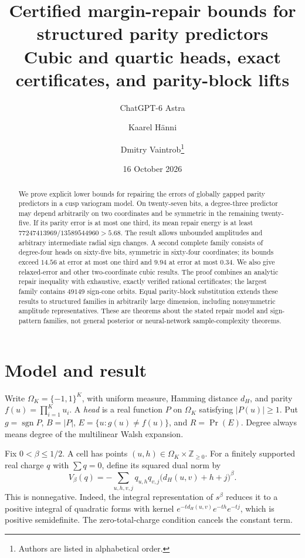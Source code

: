 \documentclass[11pt]{article}
\title{Certified margin-repair bounds for structured parity predictors\\[3pt]\large Cubic and quartic heads, exact certificates, and parity-block lifts}
\author{ChatGPT-6 Astra \and Kaarel H\"anni \and Dmitry Vaintrob\thanks{Authors are listed in alphabetical order.}}
\date{16 October 2026}
\newcommand{\sgn}{\operatorname{sgn}}
\begin{document}
\maketitle
\begin{abstract}
We prove explicit lower bounds for repairing the errors of globally gapped parity predictors in a cusp variogram model. On twenty-seven bits, a degree-three predictor may depend arbitrarily on two coordinates and be symmetric in the remaining twenty-five. If its parity error is at most one third, its mean repair energy is at least $77247413969/13589544960>5.68$. The result allows unbounded amplitudes and arbitrary intermediate radial sign changes. A second complete family consists of degree-four heads on sixty-five bits, symmetric in sixty-four coordinates; its bounds exceed $14.56$ at error at most one third and $9.94$ at error at most $0.34$. We also give relaxed-error and other two-coordinate cubic results. The proof combines an analytic repair inequality with exhaustive, exactly verified rational certificates; the largest family contains $49149$ sign-cone orbits. Equal parity-block substitution extends these results to structured families in arbitrarily large dimension, including nonsymmetric amplitude representatives. These are theorems about the stated repair model and sign-pattern families, not general posterior or neural-network sample-complexity theorems.
\end{abstract}

\section{Model and result}
Write $\Omega_K=\{-1,1\}^K$, with uniform measure, Hamming distance $d_H$, and parity $f(u)=\prod_{i=1}^K u_i$. A \emph{head} is a real function $P$ on $\Omega_K$ satisfying $|P(u)|\ge1$. Put $g=\sgn P$, $B=|P|$, $E=\{u:g(u)\ne f(u)\}$, and $R=\Pr(E)$. Degree always means degree of the multilinear Walsh expansion.

Fix $0<\beta\le1/2$. A cell has points $(u,h)\in\Omega_K\times\mathbb Z_{\ge0}$. For a finitely supported real charge $q$ with $\sum q=0$, define its squared dual norm by
\begin{equation}\label{eq:variance}
 V_\beta(q)=-\sum_{u,h,v,j}q_{u,h}q_{v,j}\bigl(d_H(u,v)+h+j\bigr)^\beta.
\end{equation}
This is nonnegative. Indeed, the integral representation of $s^\beta$ reduces it to a positive integral of quadratic forms with kernel $e^{-t d_H(u,v)}e^{-th}e^{-tj}$, which is positive semidefinite. The zero-total-charge condition cancels the constant term.
\end{document}
